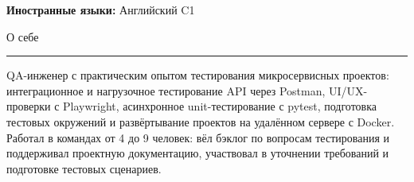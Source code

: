 \documentclass[14pt, a4paper, oneside]{extarticle}
\begin{document}
\textbf{Иностранные языки:} Английский C1


\begin{flushleft}
	\vspace{-\intextsep}
	\large О себе
\end{flushleft}

\vspace{-0.8\intextsep}
\hrule

\begin{sloppypar}
	\vspace{0.5\intextsep}
	\quad
	QA-инженер с практическим опытом тестирования микросервисных проектов: интеграционное и нагрузочное тестирование API через Postman, UI/UX-проверки с Playwright, асинхронное unit-тестирование с pytest, подготовка тестовых окружений и развёртывание проектов на удалённом сервере с Docker. Работал в командах от 4 до 9 человек: вёл бэклог по вопросам тестирования и поддерживал проектную документацию, участвовал в уточнении требований и подготовке тестовых сценариев.
\end{sloppypar}
\end{document}
